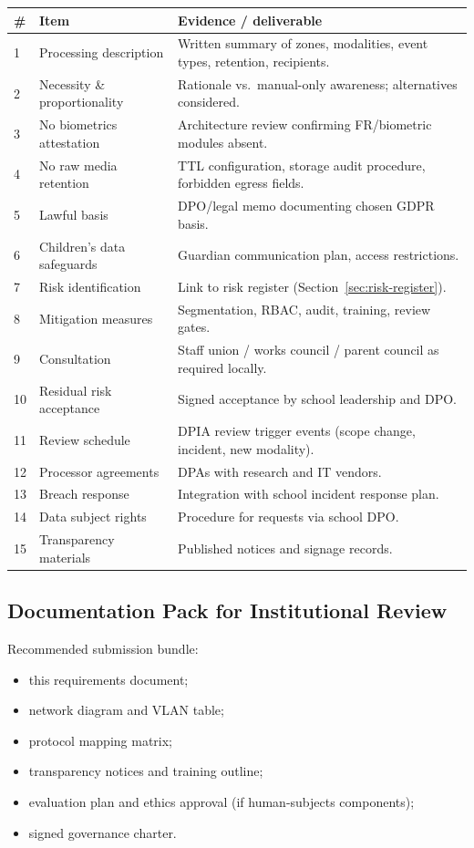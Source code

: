 \begin{longtable}{@{}p{0.6cm}p{5.2cm}p{6.8cm}@{}}
\toprule
\# & Item & Evidence / deliverable \\
\midrule
\endhead
1 & Processing description &
  Written summary of zones, modalities, event types, retention, recipients. \\
2 & Necessity \& proportionality &
  Rationale vs.\ manual-only awareness; alternatives considered. \\
3 & No biometrics attestation &
  Architecture review confirming FR/biometric modules absent. \\
4 & No raw media retention &
  TTL configuration, storage audit procedure, forbidden egress fields. \\
5 & Lawful basis &
  DPO/legal memo documenting chosen GDPR basis. \\
6 & Children's data safeguards &
  Guardian communication plan, access restrictions. \\
7 & Risk identification &
  Link to risk register (Section~\ref{sec:risk-register}). \\
8 & Mitigation measures &
  Segmentation, RBAC, audit, training, review gates. \\
9 & Consultation &
  Staff union / works council / parent council as required locally. \\
10 & Residual risk acceptance &
  Signed acceptance by school leadership and DPO. \\
11 & Review schedule &
  DPIA review trigger events (scope change, incident, new modality). \\
12 & Processor agreements &
  DPAs with research and IT vendors. \\
13 & Breach response &
  Integration with school incident response plan. \\
14 & Data subject rights &
  Procedure for requests via school DPO. \\
15 & Transparency materials &
  Published notices and signage records. \\
\bottomrule
\end{longtable}

\subsection{Documentation Pack for Institutional Review}

Recommended submission bundle:
\begin{itemize}[noitemsep]
  \item this requirements document;
  \item network diagram and VLAN table;
  \item protocol mapping matrix;
  \item transparency notices and training outline;
  \item evaluation plan and ethics approval (if human-subjects components);
  \item signed governance charter.
\end{itemize}

